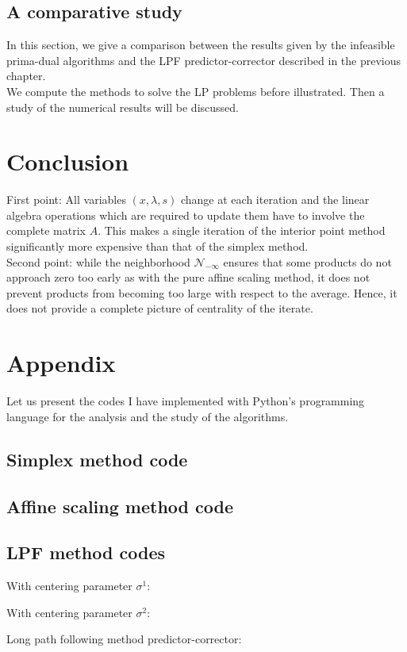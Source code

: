 \documentclass[a4paper,10 pt,titlepage,twoside]{book}
\theoremstyle{plain}
\theoremstyle{definition}
\theoremstyle{remark}
\begin{document}
\section{A comparative study}
In this section, we give a comparison between the results given by the infeasible prima-dual algorithms and the LPF predictor-corrector described in the previous chapter.\\ We compute the methods to solve the LP problems before illustrated. Then a study of the numerical results will be discussed.


\chapter{Conclusion}
 First point: All variables $(x, \lambda, s)$ change at each iteration and the linear algebra operations which are required to update them have to involve the complete matrix $A$. This makes a single iteration of the interior point method significantly more expensive than that of the simplex method.\\
 Second point: while the neighborhood $\mathcal{N}_{-\infty}$ ensures that some products do not approach zero too early as with the pure affine scaling method, it does not prevent products from becoming too large with respect to the average. Hence, it does not provide a complete picture of centrality of the iterate.

\chapter*{Appendix}	
 Let us present the codes I have implemented with Python's programming language for the analysis and the study of the algorithms.
 \section{Simplex method code}\label{app:A.1}
 
 \section{Affine scaling method code}
 
 \section{LPF method codes}
 With centering parameter $\sigma^{1}$:
 
With centering parameter $\sigma^{2}$:
 
Long path following method predictor-corrector:
 
\end{document}
